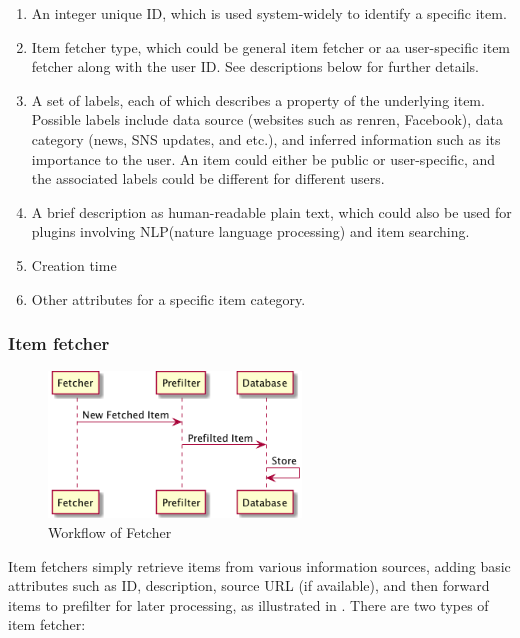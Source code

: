 \begin{enumerate}
\def\labelenumi{\arabic{enumi}.}
\itemsep1pt\parskip0pt
\item
  An integer unique ID, which is used system-widely to identify a
  specific item.
\item
  Item fetcher type, which could be general item fetcher or aa
  user-specific item fetcher along with the user ID. See descriptions
  below for further details.
\item
  A set of labels, each of which describes a property of the underlying
  item. Possible labels include data source (websites such as renren,
  Facebook), data category (news, SNS updates, and etc.), and inferred
  information such as its importance to the user. An item could either
  be public or user-specific, and the associated labels could be
  different for different users.
\item
  A brief description as human-readable plain text, which could also be
  used for plugins involving NLP(nature language processing) and item
  searching.
\item
  Creation time
\item
  Other attributes for a specific item category.
\end{enumerate}

\subsubsection{Item fetcher}

\begin{figure}[H]
  \centering
  \includegraphics[width=0.6\textwidth]{img/fetch.png}
  \caption{Workflow of Fetcher \label{fig:fetcher}}
\end{figure}


Item fetchers simply retrieve items from various information sources,
adding basic attributes such as ID, description, source URL (if
available), and then forward items to prefilter for later processing, as illustrated in .
There are two types of item fetcher:

